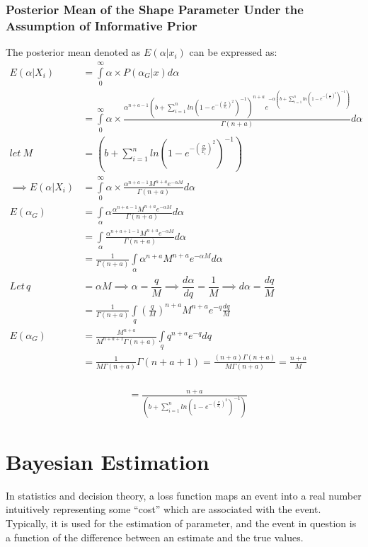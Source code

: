 \documentclass[a4paper,12pt]{report}
\newcommand{\para}{\hspace{0.5cm}}
\begin{document}
\subsubsection{Posterior Mean of the Shape Parameter Under the Assumption of Informative Prior}
The posterior mean denoted as $E(\alpha|x_i)$ can be expressed as:
\[\begin{split}
E(\alpha|X_i)&=\int\limits_{0}^{\infty}\alpha \times P(\alpha_G|x)d\alpha\\
&=\int\limits_{0}^{\infty}\alpha \times \frac{\alpha^{n+a-1}\left(b+\sum\limits_{ i=1 }^{n}ln\left(1-e^{-\left(\frac{\sigma}{x_i}\right)^2}\right)^{-1}\right)^{n+a}e^{-\alpha\left(b+\sum\limits_{ i=1 }^{n}ln\left(1-e^{-\left(\frac{\sigma}{x_i}\right)^2}\right)^{-1}\right)}} {\Gamma(n+a)} d\alpha\\
let\ M&=\left(b+\sum\limits_{ i=1 }^{n}ln\left(1-e^{-\left(\frac{\sigma}{x_i}\right)^2}\right)^{-1}\right)\\
\implies E(\alpha|X_i)&=\int\limits_{0}^{\infty}\alpha \times \frac{\alpha^{n+a-1}M^{n+a}e^{-\alpha M}} {\Gamma(n+a)} d\alpha\\
E(\alpha_G)&=\int\limits_{\alpha}\alpha \frac{\alpha^{n+a-1}M^{n+a} e^{-\alpha M}}{\Gamma(n+a)} d\alpha \\
&=\int\limits_{\alpha}\frac{\alpha^{n+a+1-1}M^{n+a} e^{-\alpha M}}{\Gamma(n+a)} d\alpha\\
&=\frac{1}{\Gamma(n+a)}\int\limits_{\alpha}\alpha^{n+a}M^{n+a} e^{-\alpha M}d\alpha\\
Let\,q&=\alpha M\implies\alpha=\dfrac{q}{M}\implies\dfrac{d\alpha}{dq}=\dfrac{1}{M}\implies d\alpha=\dfrac{dq}{M}\\
&=\frac{1}{\Gamma(n+a)}\int\limits_{q}\left(\frac{q}{M}\right)^{n+a}M^{n+a} e^{-q}\frac{dq}{M}\\
E(\alpha_G)&=\frac{M^{n+a}}{M^{n+a+1}\Gamma(n+a)}\int\limits_{q}q^{n+a}e^{-q}dq\\
&=\frac{1}{M\Gamma(n+a)}\Gamma(n+a+1)=\frac{(n+a)\Gamma(n+a)}{M\Gamma(n+a)}=\frac{n+a}{M}\\
\end{split}\]

\begin{equation}\label{pm2}
\begin{split}
&=\frac{n+a}{\left(b+\sum\limits_{ i=1 }^{n}ln\left(1-e^{-\left(\frac{\sigma}{x_i}\right)^2}\right)^{-1}\right)}
\end{split}
\end{equation}
\section{Bayesian Estimation}
\noindent\para In statistics and decision theory, a loss function maps an event into a real number intuitively representing some “cost” which are associated with the event. Typically, it is used for the estimation of parameter, and the event in question is a function of the difference between an estimate and the true values.
\end{document}
